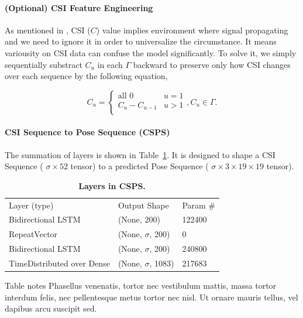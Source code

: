 \documentclass[10pt,letterpaper]{article}
\newlength\savedwidth
\newcommand\thickhline{\noalign{\global\savedwidth\arrayrulewidth\global\arrayrulewidth 2pt}%
\hline
\noalign{\global\arrayrulewidth\savedwidth}}
\begin{document}
\paragraph*{(Optional) CSI Feature Engineering}
As mentioned in , CSI ($C$) value implies environment where signal propagating and we need to ignore it in order to universalize the circumstance. It means variousity on CSI data can confuse the model significantly. To solve it, we simply sequentially substract $C_u$  in each $\Gamma$ backward to preserve only how CSI changes over each sequence by the following equation,


\begin{equation}
C_u =  \begin{cases}
\text{all } 0 &\text{$u = 1$}\\
C_u - C_{u-1} &\text{$u > 1 $}\\
\end{cases}, C_u \in \Gamma.
\label{eq:CSIFeatureEn}
\end{equation}



\paragraph*{CSI Sequence to Pose Sequence (CSPS)}

The summation of layers is shown in Table~\ref{table:CSPS}.
It is designed to shape a CSI Sequence ( $\sigma \times 52$ tensor) to a predicted Pose Sequence ( $\sigma \times 3\times 19\times 19$ tensor).

\begin{table}[!ht]
	\begin{adjustwidth}{-2.25in}{0in} %
		\centering
		\caption{
		{\bf Layers in CSPS.}}
		\begin{tabular}{lll}
			\hline
			Layer (type)       & Output Shape     & Param \# \\ 
			\thickhline
			Bidirectional LSTM & (None, 200)      & 122400   \\
			RepeatVector       & (None, $\sigma$, 200)  & 0        \\
			Bidirectional LSTM & (None, $\sigma$, 200)  & 240800   \\
			TimeDistributed over Dense    & (None, $\sigma$, 1083) & 217683   \\ \hline
		\end{tabular}
	
		\begin{flushleft} Table notes Phasellus venenatis, tortor nec vestibulum mattis, massa tortor interdum felis, nec pellentesque metus tortor nec nisl. Ut ornare mauris tellus, vel dapibus arcu suscipit sed.
		\end{flushleft}
		\label{table:CSPS}
	\end{adjustwidth}
\end{table}
\end{document}
